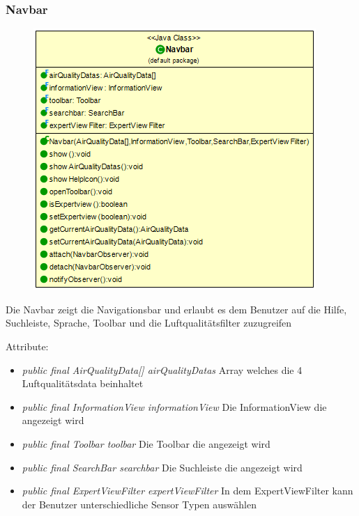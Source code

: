 \subsubsection{Navbar}
\begin{minipage}{0.5\textwidth}
    \begin{figure}[H]
        {\centering\includegraphics[scale = 0.45
        ]{media/view/navbar/Navbar_Class.png}}
    \end{figure}
    \end{minipage} \hfill
    \begin{minipage}{0.5\textwidth}
Die Navbar zeigt die Navigationsbar und erlaubt es dem Benutzer auf die Hilfe, Suchleiste, Sprache, Toolbar und die Luftqualitätsfilter zuzugreifen
\end{minipage}
\vspace{\baselineskip}
Attribute:\begin{itemize} [noitemsep]
    \item \emph{public final AirQualityData[] airQualityDatas} Array welches die 4 Luftqualitätsdata beinhaltet
    \item \emph{public final InformationView informationView} Die InformationView die angezeigt wird
    \item \emph{public final Toolbar toolbar} Die Toolbar die angezeigt wird
    \item \emph{public final SearchBar searchbar} Die Suchleiste die angezeigt wird
    \item \emph{public final ExpertViewFilter expertViewFilter} In dem ExpertViewFilter kann der Benutzer unterschiedliche Sensor Typen auswählen
\end{itemize}
